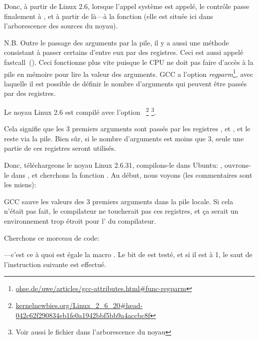 Donc, à partir de Linux 2.6, lorsque l'appel système  est appelé, le
contrôle passe finalement à , et à partir de là---à la fonction
 (elle est située ici  dans l'arborescence des
sources du noyau).

\newcommand{\URLREGPARM}{\href{http://www.ohse.de/uwe/articles/gcc-attributes.html\#func-regparm}{ohse.de/uwe/articles/gcc-attributes.html\#func-regparm}}

\label{regparm}
N.B. Outre le passage des arguments par la pile, il y a aussi une méthode consistant
à passer certains d'entre eux par des registres. Ceci est aussi appelé fastcall~().
Ceci fonctionne plus vite puisque le CPU ne doit pas faire d'accès à la pile en mémoire
pour lire la valeur des arguments.
GCC a l'option \emph{regparm}\footnote{\URLREGPARM}, avec laquelle il est possible
de définir le nombre d'arguments qui peuvent être passés par des registres.

\newcommand{\URLKERNELNEWB}{\href{http://kernelnewbies.org/Linux_2_6_20\#head-042c62f290834eb1fe0a1942bbf5bb9a4accbc8f}{kernelnewbies.org/Linux\_2\_6\_20\#head-042c62f290834eb1fe0a1942bbf5bb9a4accbc8f}}
\newcommand{\CALLINGHFILE}{arch/x86/include/asm/calling.h}

Le noyau Linux 2.6 est compilé avec l'option ~\footnote{\URLKERNELNEWB}
\footnote{Voir aussi le fichier \TT{\CALLINGHFILE} dans l'arborescence du noyau}.

Cela signifie que les 3 premiers arguments sont passés par les registres \EAX, \EDX
et \ECX, et le reste via la pile.
Bien sûr, si le nombre d'arguments est moins que 3, seule une partie de ces registres
seront utilisés.

Donc, téléchargeons le noyau Linux 2.6.31, compilons-le dans Ubuntu: ,
ouvrons-le dans \IDA, et cherchons la fonction . Au début, nous
voyons (les commentaires sont les miens):



GCC sauve les valeurs des 3 premiers arguments dans la pile locale.
Si cela n'était pas fait, le compilateur ne toucherait pas ces registres, et ça serait
un environnement trop étroit pour l'
du compilateur.

Cherchons ce morceau de code:



---c'est ce à quoi est égale la macro .
Le bit  de  est testé, et si il est à 1, le saut de l'instruction
\JNZ suivante est effectué.

